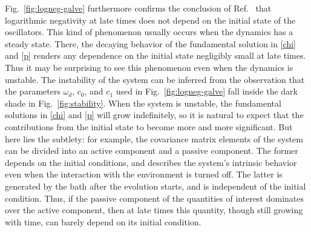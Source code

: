 \documentclass[11pt,a4paper]{article}
\begin{document}
Fig.~\ref{fig:logneg-galve} furthermore confirms the conclusion of Ref.~\cite{galve-prl} that logarithmic negativity at late times does not depend on the initial state of the oscillators. This kind of phenomenon usually occurs when the dynamics has a steady state. There, the decaying behavior of the fundamental solution in \eqref{chi} and \eqref{p} renders any dependence on the initial state negligibly small at late times. Thus it may be surprising to see this phenomenon even when the dynamics is unstable. The instability of the system can be inferred from the observation that the parameters $\omega_{d}$, $c_{0}$, and $c_{1}$ used in Fig.~\ref{fig:logneg-galve} fall inside the dark shade in Fig.~\ref{fig:stability}. When the system is unstable, the fundamental solutions in \eqref{chi} and \eqref{p} will grow indefinitely, so it is natural to expect that the contributions from the initial state to become more and more significant. But here lies the subtlety: for example, the covariance matrix elements of the system can be divided into an active component and a passive component. The former depends on the initial conditions,  and describes the system's intrinsic behavior even when the interaction with the environment is turned off. The latter is generated by the bath after the evolution starts, and is independent of the initial condition. Thus, if the passive component of {the quantities of interest} dominates over the active component, then at late times this quantity, though still growing with time, can barely depend on its initial condition.
\end{document}
